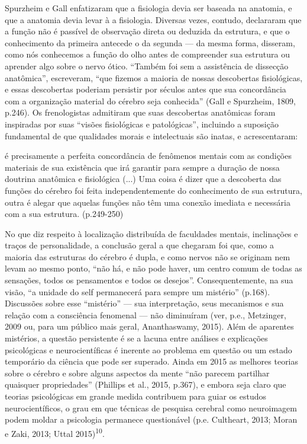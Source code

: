 Spurzheim e Gall enfatizaram que a fisiologia devia ser baseada na
anatomia, e que a anatomia devia levar à a fisiologia. Diversas vezes,
contudo, declararam que a função não é passível de observação direta ou
deduzida da estrutura, e que o conhecimento da primeira antecede o da
segunda --- da mesma forma, disseram, como nós conhecemos a função do
olho antes de compreender sua estrutura ou aprender algo sobre o nervo
ótico. ``Também foi sem a assistência de dissecção anatômica'',
escreveram, ``que fizemos a maioria de nossas descobertas fisiológicas,
e essas descobertas poderiam persistir por séculos antes que sua
concordância com a organização material do cérebro seja conhecida''
(Gall e Spurzheim, 1809, p.246). Os frenologistas admitiram que suas
descobertas anatômicas foram inspiradas por suas ``visões fisiológicas e
patológicas'', incluindo a suposição fundamental de que qualidades
morais e intelectuais são inatas, e acrescentaram:

é precisamente a perfeita concordância de fenômenos mentais com as
condições materiais de sua existência que irá garantir para sempre a
duração de nossa doutrina anatômica e fisiológica (...) Uma coisa é
dizer que a descoberta das funções do cérebro foi feita
independentemente do conhecimento de sua estrutura, outra é alegar que
aquelas funções não têm uma conexão imediata e necessária com a sua
estrutura. (p.249-250)

No que diz respeito à localização distribuída de faculdades mentais,
inclinações e traços de personalidade, a conclusão geral a que chegaram
foi que, como a maioria das estruturas do cérebro é dupla, e como nervos
não se originam nem levam ao mesmo ponto, ``não há, e não pode haver, um
centro comum de todas as sensações, todos os pensamentos e todos os
desejos''. Consequentemente, na sua visão, ``a unidade do self
permanecerá para sempre um mistério'' (p.168). Discussões sobre esse
``mistério'' --- sua interpretação, seus mecanismos e sua relação com a
consciência fenomenal --- não diminuíram (ver, p.e., Metzinger, 2009 ou,
para um público mais geral, Ananthaswamy, 2015). Além de aparentes
mistérios, a questão persistente é se a lacuna entre análises e
explicações psicológicas e neurocientíficas é inerente ao problema em
questão ou um estado temporário da ciência que pode ser superado. Ainda
em 2015 as melhores teorias sobre o cérebro e sobre alguns aspectos da
mente ``não parecem partilhar quaisquer propriedades'' (Phillips et al.,
2015, p.367), e embora seja claro que teorias psicológicas em grande
medida contribuem para guiar os estudos neurocientíficos, o grau em que
técnicas de pesquisa cerebral como neuroimagem podem moldar a psicologia
permanece questionável (p.e. Cultheart, 2013; Moran e Zaki, 2013; Uttal
2015)\textsuperscript{10}.

